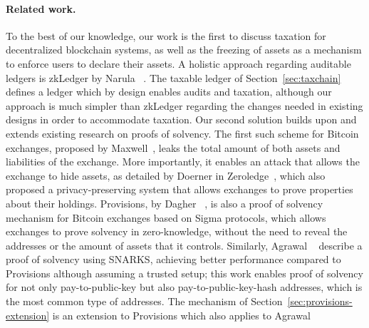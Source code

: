 \paragraph{Related work.}\label{sec:related}

To the best of our knowledge, our work is the first to discuss taxation for
decentralized blockchain systems, as well as the freezing of assets as a
mechanism to enforce users to declare their assets. A holistic approach
regarding auditable ledgers is zkLedger by Narula
\etal~\cite{EPRINT:NarVasVir18}. The taxable ledger of
Section~\ref{sec:taxchain} defines a ledger which by design enables audits and
taxation, although our approach is much simpler than zkLedger regarding the
changes needed in existing designs in order to accommodate taxation.  Our
second solution builds upon and extends existing research on proofs of
solvency. The first such scheme for Bitcoin exchanges, proposed by
Maxwell~\cite{wilcox2014proving}, leaks the total amount of both assets and
liabilities of the exchange. More importantly, it enables an attack that allows
the exchange to hide assets, as detailed by Doerner \etal in
Zeroledge~\cite{doernerzeroledge}, which also proposed a privacy-preserving
system that allows exchanges to prove properties about their holdings.
Provisions, by Dagher \etal~\cite{CCS:DBBCB15}, is also a proof of solvency
mechanism for Bitcoin exchanges based on Sigma protocols, which allows
exchanges to prove solvency in zero-knowledge, \ie without the need to reveal
the addresses or the amount of assets that it controls. Similarly, Agrawal
\etal~\cite{C:AgrGanMoh18} describe a proof of solvency using SNARKS, achieving
better performance compared to Provisions although assuming a trusted setup;
this work enables proof of solvency for not only pay-to-public-key but also
pay-to-public-key-hash addresses, which is the most common type of addresses.
The mechanism of Section~\ref{sec:provisions-extension} is an extension to
Provisions which also applies to Agrawal \etal
